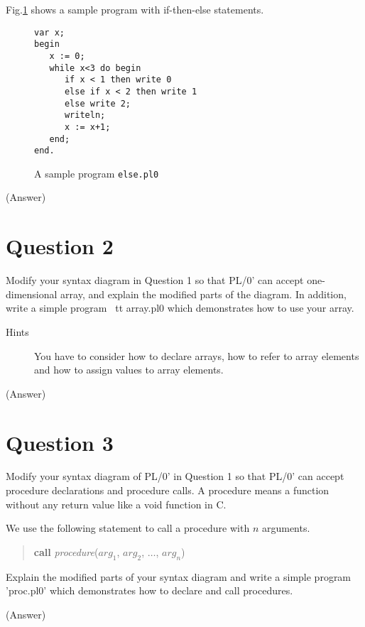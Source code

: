 \documentclass{article}
\begin{document}
Fig.\ref{fig:if-then-else} shows a sample program with if-then-else statements.
\begin{figure}[h]
\begin{verbatim}
var x;
begin
   x := 0;
   while x<3 do begin
      if x < 1 then write 0
      else if x < 2 then write 1
      else write 2;
      writeln;
      x := x+1;
   end;
end.
\end{verbatim}
\caption{A sample program {\tt else.pl0}}\label{fig:if-then-else}
\end{figure}


\ifreport
(Answer)\\
\fi




\section*{Question 2}
Modify your syntax diagram in Question 1 so that PL/0' can accept one-dimensional array,
and explain the modified parts of the diagram.
In addition, write a simple program {\ tt array.pl0} which demonstrates how to use your array.

\begin{description}
 \item[Hints] You have to consider how to declare arrays, 
	    how to refer to array elements and how to assign values to array elements.
\end{description}

\ifreport
(Answer)\\
\fi





\section*{Question 3}

Modify your syntax diagram of PL/0' in Question 1 so that PL/0' 
can accept procedure declarations and procedure calls.
A procedure means a function without any return value like a void function in C.

We use the following statement to call a procedure with $n$ arguments.
\begin{quote}
 {\bf call} {\it procedure}($arg_1$, $arg_2$, $\dots$, $arg_n$)
\end{quote}

Explain the modified parts of your syntax diagram and 
write a simple program 'proc.pl0' which demonstrates how to declare and call procedures.


\ifreport
(Answer)\\
\fi
\end{document}
